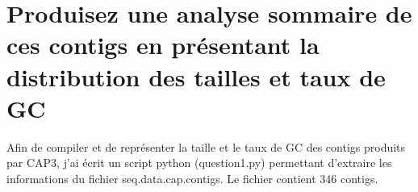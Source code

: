 \documentclass[10.9pt]{article} %
\begin{document}

\tableofcontents %

\newpage %

\section{Produisez une analyse sommaire de ces contigs en présentant la distribution des tailles et taux de GC} %

Afin de compiler et de représenter la taille et le taux de GC des contigs produits par
CAP3, j'ai écrit un script python (question1.py) permettant d'extraire les informations du
fichier seq.data.cap.contigs. Le fichier contient 346 contigs.
\end{document}
